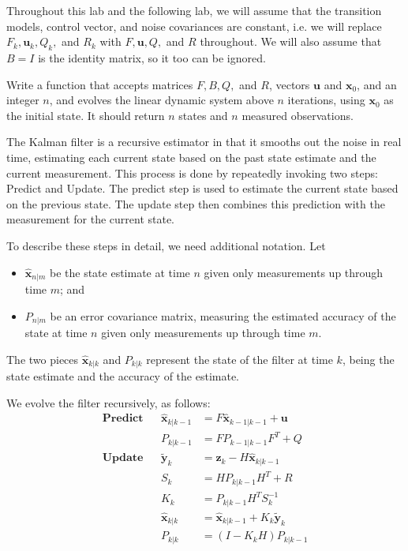 Throughout this lab and the following lab, we will assume that the transition models, control vector, and noise covariances are constant, i.e. we will replace $F_{k}, \mathbf{u}_{k}, Q_{k},$ and $R_{k}$ with $F, \mathbf{u}, Q,$ and $R$ throughout. We will also assume that $B = I$ is the identity matrix, so it too can be ignored.

\begin{problem}
Write a function that accepts matrices $F, B, Q,$ and $R$, vectors $\mathbf{u}$ and $\mathbf{x}_{0}$, and an integer $n$, and evolves the linear dynamic system above $n$ iterations, using $\mathbf{x}_{0}$ as the initial state. It should return $n$ states and $n$ measured observations.
\end{problem}

The Kalman filter is a recursive estimator in that it smooths out the noise in real time, estimating each current state based on the past state estimate and the current measurement. This process is done by repeatedly invoking two steps: Predict and Update. The predict step is used to estimate the current state based on the previous state. The update step then combines this prediction with the measurement for the current state.

To describe these steps in detail, we need additional notation. Let 
\begin{itemize}
	\item $\widehat{\mathbf{x}}_{n|m}$ be the state estimate at time $n$ given only measurements up through time $m$; and
	\item $P_{n|m}$ be an error covariance matrix, measuring the estimated accuracy of the state at time $n$ given only measurements up through time $m$.
\end{itemize}

The two pieces $\widehat{\mathbf{x}}_{k|k}$ and $P_{k|k}$ represent the state of the filter at time $k$, being the state estimate and the accuracy of the estimate.

We evolve the filter recursively, as follows:
\begin{align*}
\textbf{Predict} & & \widehat{\mathbf{x}}_{k|k-1} & = F\widehat{\mathbf{x}}_{k-1|k-1} + \mathbf{u} \\
 & & P_{k|k-1} & = FP_{k-1|k-1}F^{T} + Q \\
\textbf{Update} & & \tilde{\mathbf{y}}_{k} & = \mathbf{z}_{k} - H\widehat{\mathbf{x}}_{k|k-1} \\
 & & S_{k} & = HP_{k|k-1}H^{T} + R \\
 & & K_{k} & = P_{k|k-1}H^{T}S_{k}^{-1} \\
 & & \widehat{\mathbf{x}}_{k|k} & = \widehat{\mathbf{x}}_{k|k-1} + K_{k}\tilde{\mathbf{y}}_{k} \\
 & & P_{k|k} & = (I - K_{k}H)P_{k|k-1}
\end{align*}

